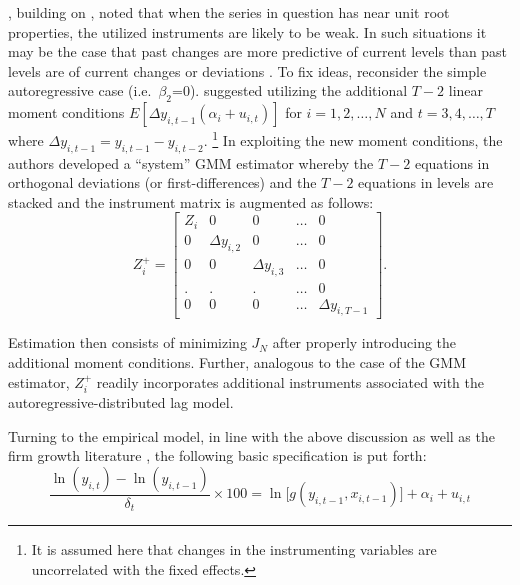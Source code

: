 \documentclass[english]{article}
\begin{document}
\citet{blundell1998}, building on \citet{arellano1995}, noted that when the 
series in question has near unit root properties, the utilized instruments are 
likely to be weak.
In such situations it may be the case that past changes are more predictive of 
current levels than past levels are of current changes or deviations 
\citep{roodman2009}. 
To fix ideas, reconsider the simple autoregressive case (i.e.\ $\beta_2$=0). 
\citeauthor{blundell1998} suggested utilizing the additional $T-2$ linear 
moment conditions $E[\Delta y_{i,t-1} (\alpha_i + u_{i,t})]$ for 
$i=1,2,\ldots,N$ and $t=3,4,\ldots,T$ where $\Delta y_{i,t-1} = y_{i,t-1} - 
y_{i,t-2}$.%
\footnote{It is assumed here that changes in the instrumenting variables are 
uncorrelated with the fixed effects.}
In exploiting the new moment conditions, the authors developed a ``system'' 
GMM estimator whereby the $T-2$ equations in orthogonal deviations 
(or first-differences) and the $T-2$ equations in levels are stacked and the 
instrument matrix is augmented as follows:
\begin{equation}
Z_{i}^{+} = \left[ 
\begin{array}{ccccccc}
Z_i  & 0 & 0 & \ldots & 0\\
0 & \Delta y_{i,2} & 0 & \ldots & 0 \\
0 & 0 & \Delta y_{i,3} & \ldots & 0 \\
. & . & . & \ldots & 0 \\
0 & 0 & 0 & \ldots & \Delta y_{i,T-1}
\end{array}
\right].
\label{znew}
\end{equation}

\noindent
Estimation then consists of minimizing $J_N$ after properly introducing the 
additional moment conditions. 
Further, analogous to the case of the \citeauthor{arellano1991} GMM 
estimator, $Z_{i}^{+}$ readily incorporates additional instruments 
associated with the autoregressive-distributed lag model.

Turning to the empirical model, in line with the above discussion as well as 
the firm growth literature
\citep{evans1987, sleuwaegen2002, rizov2003, dries2004b}, the following 
basic specification is put forth:
\begin{equation}
\frac{\ln (y_{i,t}) - \ln(y_{i,t-1})}{\delta_t} \times 100 = \ln \big[g(y_{i,t-1}, 
x_{i,t-1})\big] + \alpha_i + u_{i,t}
\label{emodel}
\end{equation}
\end{document}
